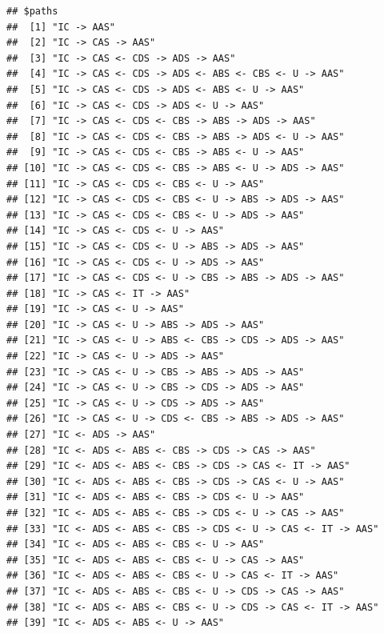\documentclass[
  10pt,
  dvipsnames,enabledeprecatedfontcommands]{scrartcl}
\begin{document}
\begin{verbatim}
## $paths
##  [1] "IC -> AAS"                                              
##  [2] "IC -> CAS -> AAS"                                       
##  [3] "IC -> CAS <- CDS -> ADS -> AAS"                         
##  [4] "IC -> CAS <- CDS -> ADS <- ABS <- CBS <- U -> AAS"      
##  [5] "IC -> CAS <- CDS -> ADS <- ABS <- U -> AAS"             
##  [6] "IC -> CAS <- CDS -> ADS <- U -> AAS"                    
##  [7] "IC -> CAS <- CDS <- CBS -> ABS -> ADS -> AAS"           
##  [8] "IC -> CAS <- CDS <- CBS -> ABS -> ADS <- U -> AAS"      
##  [9] "IC -> CAS <- CDS <- CBS -> ABS <- U -> AAS"             
## [10] "IC -> CAS <- CDS <- CBS -> ABS <- U -> ADS -> AAS"      
## [11] "IC -> CAS <- CDS <- CBS <- U -> AAS"                    
## [12] "IC -> CAS <- CDS <- CBS <- U -> ABS -> ADS -> AAS"      
## [13] "IC -> CAS <- CDS <- CBS <- U -> ADS -> AAS"             
## [14] "IC -> CAS <- CDS <- U -> AAS"                           
## [15] "IC -> CAS <- CDS <- U -> ABS -> ADS -> AAS"             
## [16] "IC -> CAS <- CDS <- U -> ADS -> AAS"                    
## [17] "IC -> CAS <- CDS <- U -> CBS -> ABS -> ADS -> AAS"      
## [18] "IC -> CAS <- IT -> AAS"                                 
## [19] "IC -> CAS <- U -> AAS"                                  
## [20] "IC -> CAS <- U -> ABS -> ADS -> AAS"                    
## [21] "IC -> CAS <- U -> ABS <- CBS -> CDS -> ADS -> AAS"      
## [22] "IC -> CAS <- U -> ADS -> AAS"                           
## [23] "IC -> CAS <- U -> CBS -> ABS -> ADS -> AAS"             
## [24] "IC -> CAS <- U -> CBS -> CDS -> ADS -> AAS"             
## [25] "IC -> CAS <- U -> CDS -> ADS -> AAS"                    
## [26] "IC -> CAS <- U -> CDS <- CBS -> ABS -> ADS -> AAS"      
## [27] "IC <- ADS -> AAS"                                       
## [28] "IC <- ADS <- ABS <- CBS -> CDS -> CAS -> AAS"           
## [29] "IC <- ADS <- ABS <- CBS -> CDS -> CAS <- IT -> AAS"     
## [30] "IC <- ADS <- ABS <- CBS -> CDS -> CAS <- U -> AAS"      
## [31] "IC <- ADS <- ABS <- CBS -> CDS <- U -> AAS"             
## [32] "IC <- ADS <- ABS <- CBS -> CDS <- U -> CAS -> AAS"      
## [33] "IC <- ADS <- ABS <- CBS -> CDS <- U -> CAS <- IT -> AAS"
## [34] "IC <- ADS <- ABS <- CBS <- U -> AAS"                    
## [35] "IC <- ADS <- ABS <- CBS <- U -> CAS -> AAS"             
## [36] "IC <- ADS <- ABS <- CBS <- U -> CAS <- IT -> AAS"       
## [37] "IC <- ADS <- ABS <- CBS <- U -> CDS -> CAS -> AAS"      
## [38] "IC <- ADS <- ABS <- CBS <- U -> CDS -> CAS <- IT -> AAS"
## [39] "IC <- ADS <- ABS <- U -> AAS"                           

\end{verbatim}
\end{document}
